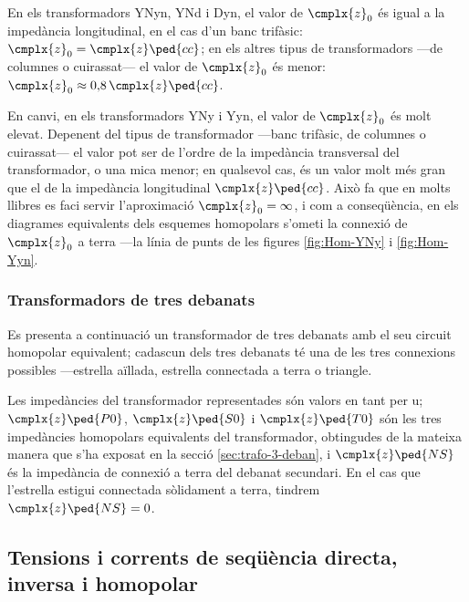 En els  transformadors YNyn, YNd i Dyn, el valor de $\cmplx{z}_0$ és igual a la impedància longitudinal, en el cas d'un banc trifàsic: $\cmplx{z}_0=\cmplx{z}\ped{cc}$; en els altres tipus de transformadors ---de columnes o cuirassat--- el valor de $\cmplx{z}_0$ és menor: $\cmplx{z}_0\approx 0{,}8\, \cmplx{z}\ped{cc}$.

En canvi, en els transformadors YNy i Yyn, el valor de $\cmplx{z}_0$ és molt elevat. Depenent del tipus de transformador ---banc trifàsic, de columnes o cuirassat--- el valor pot ser de l'ordre de la impedància transversal del transformador, o una mica menor; en qualsevol cas, és un valor molt més gran que el de la impedància longitudinal $\cmplx{z}\ped{cc}$. Això fa que en molts llibres es faci servir l'aproximació $\cmplx{z}_0 = \infty$, i com a conseqüència, en els diagrames equivalents dels esquemes homopolars s'ometi la connexió de $\cmplx{z}_0$ a terra ---la línia de punts de les figures \ref{fig:Hom-YNy} i \ref{fig:Hom-Yyn}.

\subsubsection{Transformadors de tres debanats}\label{sec:cir-hom-3-deb}

Es presenta a continuació un transformador de tres debanats amb el seu circuit homopolar equivalent; cadascun dels tres debanats té una de les tres connexions possibles ---estrella aïllada, estrella connectada a terra o triangle.

Les impedàncies del transformador representades són valors en tant per u; $\cmplx{z}\ped{P0}$, $\cmplx{z}\ped{S0}$ i $\cmplx{z}\ped{T0}$ són les tres impedàncies homopolars equivalents del transformador, obtingudes de la mateixa manera que s'ha exposat en la secció \ref{sec:trafo-3-deban}, i $\cmplx{z}\ped{NS}$ és  la impedància de connexió a terra del debanat secundari. En el cas que l'estrella estigui connectada sòlidament a terra, tindrem $\cmplx{z}\ped{NS}=0$.

\begin{center}
    
\end{center}


\subsection{Tensions i corrents de seqüència directa, inversa i homopolar}


